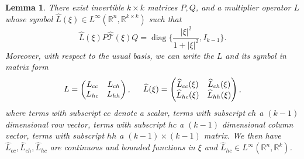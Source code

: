 \documentclass[10pt]{article}
\newtheorem{Lemma}{Lemma}[section]
\newcommand{\R}{\mathbb{R}}
\newcommand{\That}{\widehat{\mathcal{T}}}
\newcommand{\diag}{\operatorname{diag}}
\begin{document}
\begin{Lemma}\label{Lem1} There exist invertible $k \times k$ matrices $P, Q$, and a multiplier operator $L$ whose symbol $\widehat{L}(\xi) \in L^\infty(\R^n, \R^{k\times k}) $ such that
\[
\widehat{L}(\xi)P\That(\xi)Q = \diag\{\dfrac{|\xi|^2}{1+|\xi|^2},I_{k-1} \}.
\]
Moreover, with respect to the usual basis, we can write the $L$ and its symbol in matrix form
\[
L  = \begin{pmatrix}
L_{cc} & L_{ch} \\
L_{hc} & L_{hh} 
\end{pmatrix}, \hspace{0.2in}
\widehat{L}(\xi)  = \begin{pmatrix}
\widehat{L}_{cc}(\xi) & \widehat{L}_{ch}(\xi) \\
\widehat{L}_{hc}(\xi) & \widehat{L}_{hh}(\xi) 
\end{pmatrix},
\]
where terms with subscript $cc$ denote a scalar, terms with subscript $ch$ a $(k-1)$ dimensional row vector, terms with subscript $hc$ a $(k-1)$ dimensional column vector, terms with subscript $hh$ a $(k-1)\times (k-1)$ matrix. We then have $\widehat{L}_{cc},\widehat{L}_{ch},\widehat{L}_{hc}$ are continuous and bounded functions in $\xi$ and $\widehat{L}_{hc} \in L^\infty(\R^n, \R^k)$.

\end{Lemma}
\end{document}
